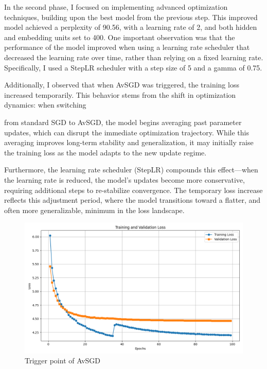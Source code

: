 \documentclass[a4paper]{article}
\begin{document}
In the second phase, I focused on implementing advanced optimization techniques, building upon
 the best model from the previous step. This improved model achieved a perplexity of 90.56, with
  a learning rate of 2, and both hidden and embedding units set to 400. One important observation
   was that the performance of the model improved when using a learning rate scheduler that decreased
    the learning rate over time, rather than relying on a fixed learning rate. Specifically, I used 
    a StepLR scheduler with a step size of 5 and a gamma of 0.75.

    Additionally, I observed that when AvSGD was triggered, the training loss increased 
    temporarily. This behavior stems from the shift in optimization dynamics: when switching
    
    from standard SGD to AvSGD, the model begins averaging past parameter updates, which can 
    disrupt the immediate optimization trajectory. While this averaging improves long-term 
    stability and generalization, it may initially raise the training loss as the model adapts
     to the new update regime.

    Furthermore, the learning rate scheduler (StepLR) compounds this effect—when the learning 
    rate is reduced, the model’s updates become more conservative, requiring additional steps 
    to re-stabilize convergence. The temporary loss increase reflects this adjustment period, 
    where the model transitions toward a flatter, and often more generalizable, minimum in the
     loss landscape.

     \begin{figure}[h!]
      \centering
      \includegraphics[width=0.8\linewidth]{images/part_A_avsdg.png}
      \caption{Trigger point of AvSGD}
      \label{fig:plot}
      \end{figure}
\newpage
\end{document}
